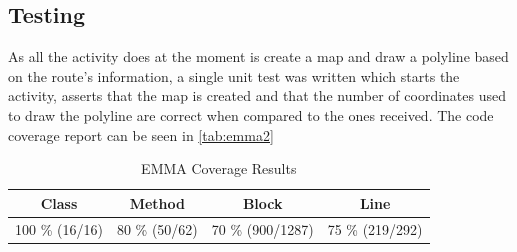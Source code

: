 \subsection{Testing}
As all the activity does at the moment is create a map and draw a polyline based on the route's information, a single unit test was written which starts the activity, asserts that the map is created and that the number of coordinates used to draw the polyline are correct when compared to the ones received. The code coverage report can be seen in \autoref{tab:emma2}

\begin{table}[!ht]
	\centering
	\begin{tabular}{| c | c | c | c |}
		\hline
		\textbf{Class} & \textbf{Method} & \textbf{Block} & \textbf{Line} \\ \hline
		100 \% (16/16) & 80 \% (50/62) & 70 \% (900/1287) & 75 \% (219/292) \\
		\hline
	\end{tabular}
	\caption{EMMA Coverage Results}
	\label{tab:emma2}
\end{table}
